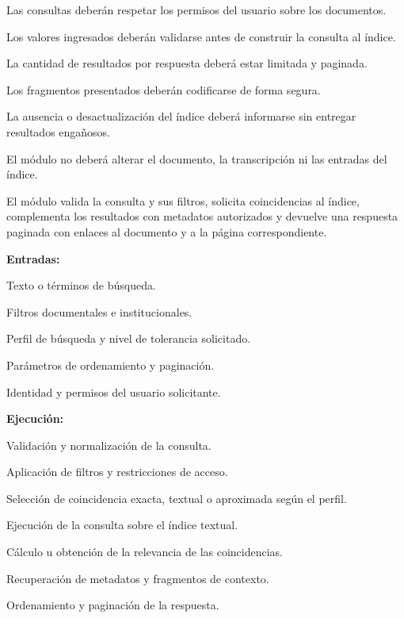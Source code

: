 \begin{definicionmodulo}
\item[Restricciones]
\begin{elementosmodulo}
    \item Las consultas deberán respetar los permisos del usuario sobre los documentos.
    \item Los valores ingresados deberán validarse antes de construir la consulta al índice.
    \item La cantidad de resultados por respuesta deberá estar limitada y paginada.
    \item Los fragmentos presentados deberán codificarse de forma segura.
    \item La ausencia o desactualización del índice deberá informarse sin entregar resultados engañosos.
    \item El módulo no deberá alterar el documento, la transcripción ni las entradas del índice.
\end{elementosmodulo}

\item[Estructura general] El módulo valida la consulta y sus filtros, solicita coincidencias al índice, complementa los resultados con metadatos autorizados y devuelve una respuesta paginada con enlaces al documento y a la página correspondiente.

\textbf{Entradas:}
\begin{elementosmodulo}
    \item Texto o términos de búsqueda.
    \item Filtros documentales e institucionales.
    \item Perfil de búsqueda y nivel de tolerancia solicitado.
    \item Parámetros de ordenamiento y paginación.
    \item Identidad y permisos del usuario solicitante.
\end{elementosmodulo}

\textbf{Ejecución:}
\begin{elementosmodulo}
    \item Validación y normalización de la consulta.
    \item Aplicación de filtros y restricciones de acceso.
    \item Selección de coincidencia exacta, textual o aproximada según el perfil.
    \item Ejecución de la consulta sobre el índice textual.
    \item Cálculo u obtención de la relevancia de las coincidencias.
    \item Recuperación de metadatos y fragmentos de contexto.
    \item Ordenamiento y paginación de la respuesta.
\end{elementosmodulo}


\end{definicionmodulo}
